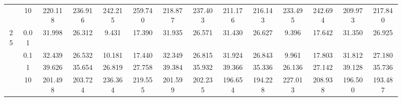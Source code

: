 \documentclass[11pt]{article}
\theoremstyle{definition}
\begin{document}
\begin{sidewaysfigure}
\begin{tabular}{cc|cccccc|cccccc}
   & 10   & 220.118 & 236.916 & 242.215 & 259.740 & 218.877 & 237.403 & 211.176 & 216.143 & 233.495 & 242.694 & 209.973 & 217.840 \\ 
\multirow{4}{*}{25}   & 0.01 & 31.998 & 26.312 & 9.431 & 17.390 & 31.935 & 26.571 & 31.430 & 26.627 & 9.396 & 17.642 & 31.350 & 26.925 \\ 
  & 0.1 & 32.439 & 26.532 & 10.181 & 17.440 & 32.349 & 26.815 & 31.924 & 26.843 & 9.961 & 17.803 & 31.812 & 27.180 \\ 
   & 1   & 39.626 & 35.654 & 26.819 & 27.758 & 39.384 & 35.932 & 39.366 & 35.336 & 26.136 & 27.142 & 39.128 & 35.736 \\ 
& 10   & 201.498 & 203.724 & 236.364 & 219.555 & 201.599 & 202.235 & 196.654 & 194.228 & 227.013 & 208.938 & 196.500 & 193.487 \\ 
\end{tabular}
\end{sidewaysfigure}
\end{document}
